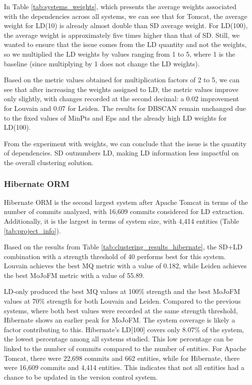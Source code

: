\documentclass{ieeeaccess}
\begin{document}
In Table \ref{tab:systems_weights}, which presents the average weights associated with the dependencies across all systems, we can see that for Tomcat, the average weight for LD(10) is already almost double than SD average weight. For LD(100), the average weight is approximately five times higher than that of SD. Still, we wanted to ensure that the issue comes from the LD quantity and not the weights, so we multiplied the LD weights by values ranging from 1 to 5, where 1 is the baseline (since multiplying by 1 does not change the LD weights).

Based on the metric values obtained for multiplication factors of 2 to 5, we can see that after increasing the weights assigned to LD, the metric values improve only slightly, with changes recorded at the second decimal: a 0.02 improvement for Louvain and 0.07 for Leiden. The results for DBSCAN remain unchanged due to the fixed values of MinPts and Eps and the already high LD weights for LD(100). 

From the experiment with weights, we can conclude that the issue is the quantity of dependencies. SD outnumbers LD, making LD information less impactful on the overall clustering solution.


\subsubsection{Hibernate ORM}



Hibernate ORM is the second largest system after Apache Tomcat in terms of the number of commits analyzed, with 16,609 commits considered for LD extraction. Additionally, it is the largest in terms of system size, with 4,414 entities (Table \ref{tab:project_info}).

Based on the results from Table \ref{tab:clustering_results_hibernate}, the SD+LD combination with a strength threshold of 40 performs best for this system. Louvain achieves the best MQ metric with a value of 0.182, while Leiden achieves the best MoJoFM metric with a value of 55.89. 

LD-only produced the best MQ values at 100\% strength and the best MoJoFM values at 70\% strength for both Louvain and Leiden. Compared to the previous systems, where both best values were recorded at the same strength threshold, Hibernate shows an earlier peak for MoJoFM. The system coverage is likely a factor contributing to this. Hibernate’s LD[100] covers only 8.07\% of the system, the lowest percentage among all systems studied. This low percentage can be linked to the number of commits compared to the number of entities. For Apache Tomcat, there were 22,698 commits and 662 entities, while for Hibernate, there were 16,609 commits and 4,414 entities. This indicates that not all entities had a chance to be updated in the version control system.
\end{document}
